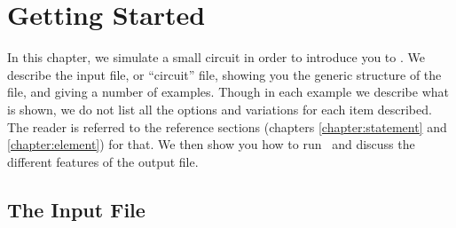 \chapter{Getting Started\label{chapter:chap2}}

In this chapter, we simulate a small circuit in order to
introduce you to \spice.  We describe the input file, or ``circuit''
file, showing you the generic structure of the file, and
giving a number of examples.   Though in each example we describe
what is shown, we do not list all the options and variations
for each item described.  The reader is referred to the reference
sections
(chapters \ref{chapter:statement} and \ref{chapter:element})
for that.  We then show
you how to run \spice\ and discuss the different features of the
output file.

\section{The Input File}

